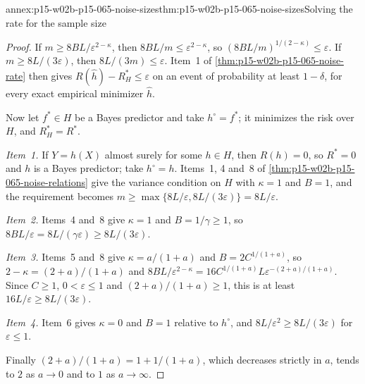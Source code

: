 \begin{annexitem}{annex:p15-w02b-p15-065-noise-sizes}{thm:p15-w02b-p15-065-noise-sizes}{Solving the rate for the sample size}
\begin{proof}
If \(m\geq8BL/\varepsilon^{2-\kappa}\), then
\(8BL/m\leq\varepsilon^{2-\kappa}\), so
\((8BL/m)^{1/(2-\kappa)}\leq\varepsilon\). If
\(m\geq8L/(3\varepsilon)\), then \(8L/(3m)\leq\varepsilon\). Item~1 of
\cref{thm:p15-w02b-p15-065-noise-rate} then gives
\(R(\widehat h)-R_H^{*}\leq\varepsilon\) on an event of probability at
least \(1-\delta\), for every exact empirical minimizer \(\widehat h\).

Now let \(f^{*}\in H\) be a Bayes predictor and take \(h^{\circ}=f^{*}\);
it minimizes the risk over \(H\), and \(R_H^{*}=R^{*}\).

\emph{Item~1.} If \(Y=h(X)\) almost surely for some \(h\in H\), then
\(R(h)=0\), so \(R^{*}=0\) and \(h\) is a Bayes predictor; take
\(h^{\circ}=h\). Items~1, 4 and~8 of
\cref{thm:p15-w02b-p15-065-noise-relations} give the variance condition on
\(H\) with \(\kappa=1\) and \(B=1\), and the requirement becomes
\(m\geq\max\{8L/\varepsilon,8L/(3\varepsilon)\}=8L/\varepsilon\).

\emph{Item~2.} Items~4 and~8 give \(\kappa=1\) and \(B=1/\gamma\geq1\), so
\(8BL/\varepsilon=8L/(\gamma\varepsilon)\geq8L/(3\varepsilon)\).

\emph{Item~3.} Items~5 and~8 give \(\kappa=a/(1+a)\) and
\(B=2C^{1/(1+a)}\), so \(2-\kappa=(2+a)/(1+a)\) and
\(8BL/\varepsilon^{2-\kappa}=16C^{1/(1+a)}L\varepsilon^{-(2+a)/(1+a)}\).
Since \(C\geq1\), \(0<\varepsilon\leq1\) and \((2+a)/(1+a)\geq1\), this is
at least \(16L/\varepsilon\geq8L/(3\varepsilon)\).

\emph{Item~4.} Item~6 gives \(\kappa=0\) and \(B=1\) relative to
\(h^{\circ}\), and \(8L/\varepsilon^2\geq8L/(3\varepsilon)\) for
\(\varepsilon\leq1\).

Finally \((2+a)/(1+a)=1+1/(1+a)\), which decreases strictly in \(a\),
tends to \(2\) as \(a\to0\) and to \(1\) as \(a\to\infty\).
\end{proof}
\end{annexitem}

